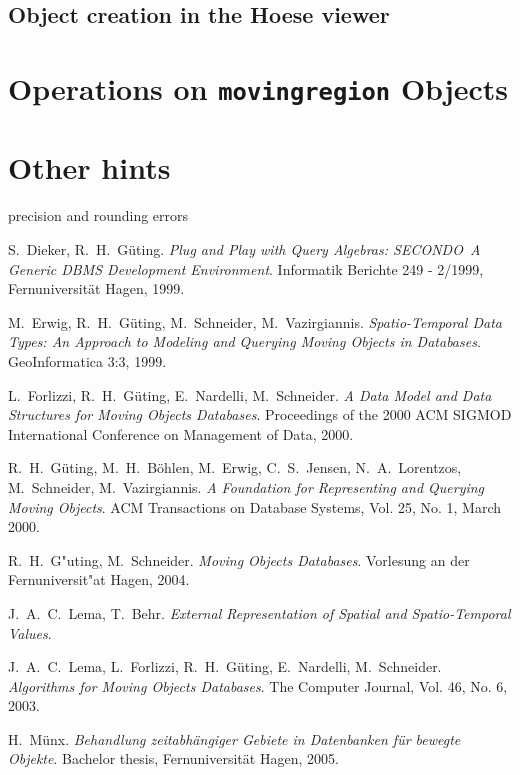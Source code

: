 \documentclass[a4paper,12pt]{article}
\newcommand{\secondo}{{\scshape SE\-CON\-DO}}
\begin{document}
\subsection{Object creation in the Hoese viewer}

\section{Operations on {\tt movingregion} Objects}
\label{operations}

\section{Other hints}

precision and rounding errors

\begin{thebibliography}{\hspace{2cm}}

  S.\ Dieker, R.\ H.\ G\"{u}ting.
  \textsl{Plug and Play with Query Algebras: \secondo\ A Generic DBMS
    Development Environment}.
  Informatik Berichte 249 - 2/1999, Fernuniversit\"{a}t Hagen, 1999.

  M.\ Erwig, R.\ H.\ G\"{u}ting, M.\ Schneider, M.\ Vazirgiannis.
  \textsl{Spatio-Temporal Data Types: An Approach to Modeling and
    Querying Moving Objects in Databases}.
  GeoInformatica 3:3, 1999.

  L.\ Forlizzi, R.\ H.\ G\"{u}ting, E.\ Nardelli, M.\ Schneider.
  \textsl{A Data Model and Data Structures for Moving Objects Databases}.
  Proceedings of the 2000 ACM SIGMOD International Conference on Management
  of Data, 2000.
  
  R.\ H.\ G\"{u}ting, M.\ H.\ B\"{o}hlen, M.\ Erwig, C.\ S.\ Jensen,
  N.\ A.\ Lorentzos, M.\ Schneider, M.\ Vazirgiannis.
  \textsl{A Foundation for Representing and Querying Moving Objects}.
  ACM Transactions on Database Systems, Vol. 25, No. 1, March 2000.

  R.\ H.\ G"uting, M.\ Schneider.
  \textsl{Moving Objects Databases}.
  Vorlesung an der Fernuniversit"at Hagen, 2004.

  J.\ A.\ C.\ Lema, T.\ Behr.
  \textsl{External Representation of Spatial and Spatio-Temporal Values}.

  J.\ A.\ C.\ Lema, L.\ Forlizzi, R.\ H.\ G\"{u}ting, E.\ Nardelli,
  M.\ Schneider.
  \textsl{Algorithms for Moving Objects Databases}.
  The Computer Journal, Vol. 46, No. 6, 2003.

  H.\ M\"{u}nx.
  \textsl{Behandlung zeitabh\"{a}ngiger Gebiete in Datenbanken
    f\"{u}r bewegte Objekte}.
  Bachelor thesis, Fernuniversit\"{a}t Hagen, 2005.

\end{thebibliography}
\end{document}
